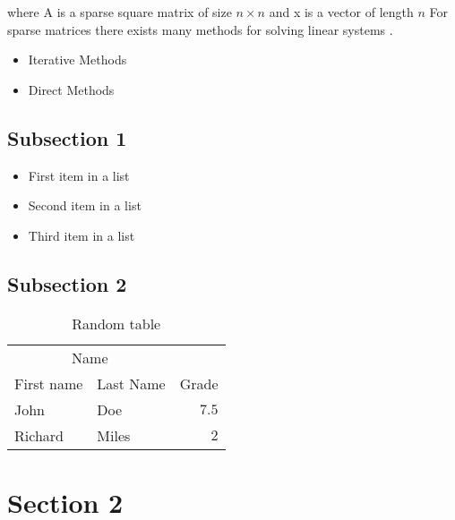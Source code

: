 \documentclass[DIV=calc, paper=a4, fontsize=10pt, twocolumn]{scrartcl}	 %
\begin{document}
where A is a sparse square matrix of size $n \times n$ and x is a vector of length $n$ For sparse matrices there exists many methods for solving linear systems \cite{bib:Golub}.  

\begin{itemize}
\item Iterative Methods
\item Direct Methods
\end{itemize}  

\subsection*{Subsection 1}

\lipsum[5] %

\begin{itemize}
\item First item in a list 
\item Second item in a list 
\item Third item in a list
\end{itemize}

\lipsum[6] %


\subsection*{Subsection 2}

\lipsum[7] %

\begin{table}
\caption{Random table}
\centering
\begin{tabular}{llr}
\toprule
\multicolumn{2}{c}{Name} \\
\cmidrule(r){1-2}
First name & Last Name & Grade \\
\midrule
John & Doe & $7.5$ \\
Richard & Miles & $2$ \\
\bottomrule
\end{tabular}
\end{table}


\section*{Section 2}

\lipsum[8] %
\end{document}
